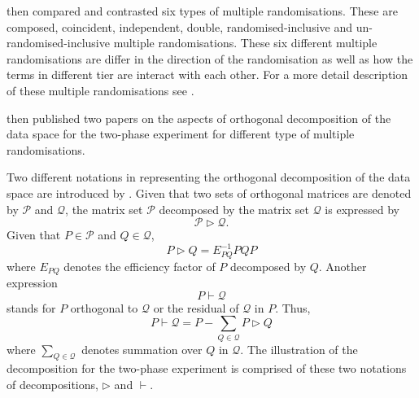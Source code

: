 \documentclass[11pt,a4paper]{article}
\begin{document}
\cite{Brien2006b} then compared and contrasted six types of multiple randomisations. These are composed, coincident, independent, double, randomised-inclusive and un-randomised-inclusive multiple randomisations. These six different multiple randomisations are differ in the direction of the randomisation as well as how the terms in different tier are interact with each other. For a more detail description of these multiple randomisations see \cite{Brien2006b}.  

\cite{Brien2009, Brien2010} then published two papers on the aspects of orthogonal decomposition of the data space for the two-phase experiment for different type of multiple randomisations.

 
Two different notations in representing the  orthogonal decomposition of the data space are introduced by \cite{Brien2009}. Given that two sets of orthogonal matrices are denoted by $\mathcal{P}$ and $\mathcal{Q}$, the matrix set $\mathcal{P}$ decomposed by the matrix set $\mathcal{Q}$ is expressed by
\begin{equation}
\mathcal{P} \rhd \mathcal{Q}.
\end{equation}
Given that $P \in \mathcal{P}$ and $Q \in \mathcal{Q}$, 
\begin{equation}
P \rhd Q =  E_{PQ}^{-1}PQP
\end{equation}
where $E_{PQ}$ denotes the efficiency factor of $P$ decomposed by $Q$. Another expression 
\begin{equation}
P \vdash \mathcal{Q}
\end{equation}
stands for $P$ orthogonal to $ \mathcal{Q}$ or the residual of $\mathcal{Q}$ in $P$. Thus, 
\begin{equation}
P \vdash  \mathcal{Q} = P - \sum_{Q \in \mathcal{Q}} P \rhd Q
\end{equation} 
where $\sum_{Q \in \mathcal{Q}}$ denotes summation over $Q$ in $\mathcal{Q}$. The illustration of the decomposition for the two-phase experiment is comprised of these two notations of decompositions, $\rhd $ and $\vdash$. 
\end{document}
